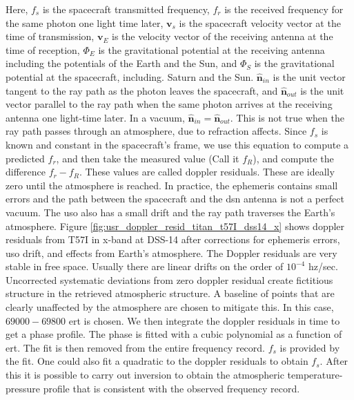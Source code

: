 \documentclass{article}
\begin{document}
            Here, $f_s$ is the spacecraft transmitted frequency, $f_r$ is the received frequency for the same photon one light time later, $\mathbf{v}_s$ is the spacecraft velocity vector at the time of transmission, $\mathbf{v}_{E}$ is the velocity vector of the receiving antenna at the time of reception, $\Phi_{E}$ is the gravitational potential at the receiving antenna including the potentials of the Earth and the Sun, and $\Phi_{S}$ is the gravitational potential at the spacecraft, including. Saturn and the Sun. $\hat{\mathbf{n}}_{in}$ is the unit vector tangent to the ray path as the photon leaves the spacecraft, and $\hat{\mathbf{n}}_{out}$ is the unit vector parallel to the ray path when the same photon arrives at the receiving antenna one light-time later. In a vacuum, $\hat{\mathbf{n}}_{in} = \hat{\mathbf{n}}_{out}$. This is not true when the ray path passes through an atmosphere, due to \gls{refraction} affects. Since $f_{s}$ is known and constant in the spacecraft's frame, we use this equation to compute a predicted $f_r$, and then take the measured value (Call it $f_{R}$), and compute the difference $f_r - f_{R}$. These values are called \glspl{doppler residual}. These are ideally zero until the atmosphere is reached. In practice, the \gls{ephemeris} contains small errors and the path between the spacecraft and the \gls{dsn} antenna is not a perfect vacuum. The \gls{uso} also has a small drift and the ray path traverses the Earth's atmosphere. Figure \ref{fig:usr_doppler_resid_titan_t57I_dss14_x} shows \glspl{doppler residual} from T57I in \gls{x-band} at DSS-14 after corrections for \gls{ephemeris} errors, \gls{uso} drift, and effects from Earth's atmosphere. The Doppler residuals are very stable in free space. Usually there are linear drifts on the order of $10^{-4}$ \gls{hz}/sec. Uncorrected systematic deviations from zero \gls{doppler residual} create fictitious structure in the retrieved atmospheric structure. A baseline of points that are clearly unaffected by the atmosphere are chosen to mitigate this. In this case, $69000 - 69800$ \gls{ert} is chosen. We then integrate the \glspl{doppler residual} in time to get a phase profile. The phase is fitted with a cubic polynomial as a function of \gls{ert}. The fit is then removed from the entire frequency record. $f_{s}$ is provided by the fit. One could also fit a quadratic to the \glspl{doppler residual} to obtain $f_{s}$. After this it is possible to carry out inversion to obtain the atmospheric \gls{temperature-pressure profile} that is consistent with the observed frequency record.
            
\end{document}
